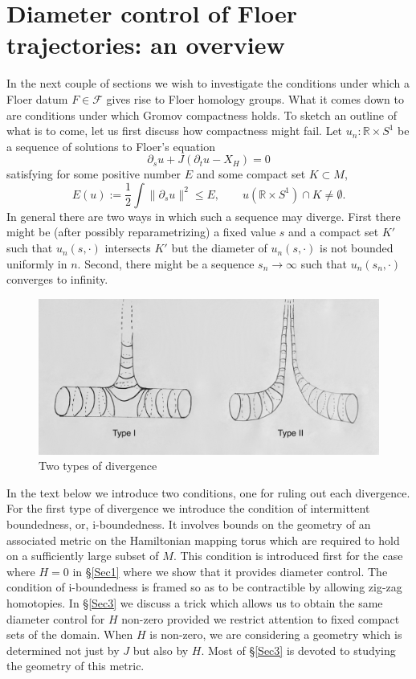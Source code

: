 \documentclass[11pt]{amsart}
\newcommand{\R}{\mathbb{R}}
\theoremstyle{definition}
\theoremstyle{remark}
\begin{document}
\section{Diameter control of Floer trajectories: an overview}\label{secOvrview}
In the next couple of sections we wish to investigate the conditions under which a Floer datum $F\in\mathcal{F}$ gives rise to Floer homology groups. What it comes down to are conditions under which Gromov compactness holds. To sketch an outline of what is to come, let us first discuss how compactness might fail. Let $u_n: \R\times S^1$ be a sequence of solutions to Floer's equation
\begin{equation}\label{eqFloer}
\partial_su+J(\partial_tu-X_{H})=0
\end{equation}
satisfying for some positive number $E$ and some compact set $K\subset M$,
\[
E(u):= \frac1{2}\int\|\partial_su\|^2\leq E,\qquad u(\R\times S^1)\cap K\neq\emptyset.
\]
In general there are two ways in which such a sequence may diverge. First there might be (after possibly reparametrizing) a fixed value $s$ and a compact set $K'$ such that $u_n(s,\cdot)$ intersects $K'$ but the diameter of $u_n(s,\cdot)$ is not bounded uniformly in $n$. Second, there might be a sequence $s_n\to\infty$ such that $u_n(s_n,\cdot)$ converges to infinity.
\begin{figure}
\includegraphics[scale=0.09]{SingularityType}
\caption{Two types of divergence}
\end{figure}

In the text below we introduce two conditions, one for ruling out each divergence. For the first type of divergence we introduce the condition of intermittent boundedness, or, i-boundedness. It involves bounds on the geometry of an associated metric on the Hamiltonian mapping torus which are required to hold on a sufficiently large subset of $M$. This condition is introduced first for the case where $H=0$ in \S \ref{Sec1} where we show that it provides diameter control. The condition of i-boundedness is framed so as to be contractible by allowing zig-zag homotopies. In \S \ref{Sec3} we discuss a trick which allows us to obtain the same diameter control for $H$ non-zero provided we restrict attention to fixed compact sets of the domain. When $H$ is non-zero, we are considering a geometry which is determined not just by $J$ but also by $H$. Most of \S\ref{Sec3} is devoted to studying the geometry of this metric.
\end{document}
